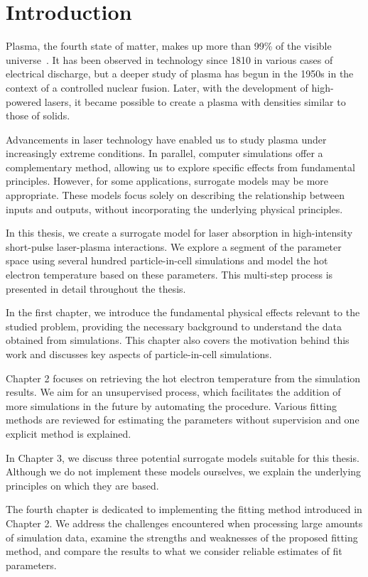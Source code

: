 \chapter*{Introduction}


Plasma, the fourth state of matter, makes up more than 99\% of the visible universe~\cite{plasma-intro}. It has been observed in technology since 1810 in various cases of electrical discharge, but a deeper study of plasma has begun in the 1950s in the context of a controlled nuclear fusion. Later, with the development of high-powered lasers, it became possible to create a plasma with densities similar to those of solids.

Advancements in laser technology have enabled us to study plasma under increasingly extreme conditions. In parallel, computer simulations offer a complementary method, allowing us to explore specific effects from fundamental principles. However, for some applications, surrogate models may be more appropriate. These models focus solely on describing the relationship between inputs and outputs, without incorporating the underlying physical principles.

In this thesis, we create a surrogate model for laser absorption in high-intensity short-pulse laser-plasma interactions. We explore a segment of the parameter space using several hundred particle-in-cell simulations and model the hot electron temperature based on these parameters. This multi-step process is presented in detail throughout the thesis.

In the first chapter, we introduce the fundamental physical effects relevant to the studied problem, providing the necessary background to understand the data obtained from simulations. This chapter also covers the motivation behind this work and discusses key aspects of particle-in-cell simulations.

Chapter 2 focuses on retrieving the hot electron temperature from the simulation results. We aim for an unsupervised process, which facilitates the addition of more simulations in the future by automating the procedure. Various fitting methods are reviewed for estimating the parameters without supervision and one explicit method is explained.

In Chapter 3, we discuss three potential surrogate models suitable for this thesis. Although we do not implement these models ourselves, we explain the underlying principles on which they are based.

The fourth chapter is dedicated to implementing the fitting method introduced in Chapter 2. We address the challenges encountered when processing large amounts of simulation data, examine the strengths and weaknesses of the proposed fitting method, and compare the results to what we consider reliable estimates of fit parameters.

